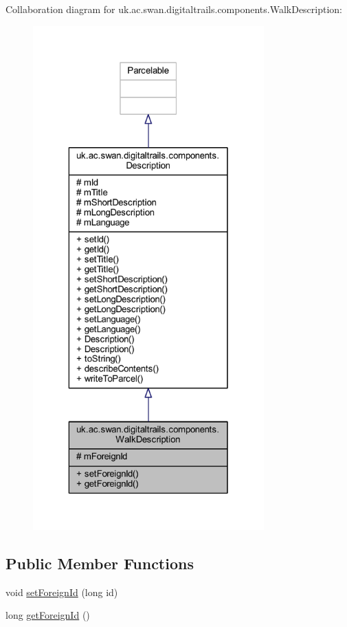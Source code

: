 Collaboration diagram for uk.\+ac.\+swan.\+digitaltrails.\+components.\+Walk\+Description\+:
\nopagebreak
\begin{figure}[H]
\begin{center}
\leavevmode
\includegraphics[height=550pt]{classuk_1_1ac_1_1swan_1_1digitaltrails_1_1components_1_1_walk_description__coll__graph}
\end{center}
\end{figure}
\subsection*{Public Member Functions}
\begin{DoxyCompactItemize}
\item 
void \hyperlink{classuk_1_1ac_1_1swan_1_1digitaltrails_1_1components_1_1_walk_description_a4d324df4e164db2cfa9c3c07912fd7b5}{set\+Foreign\+Id} (long id)
\item 
long \hyperlink{classuk_1_1ac_1_1swan_1_1digitaltrails_1_1components_1_1_walk_description_aaf82d4cb3c6580eac0c679009ce85510}{get\+Foreign\+Id} ()
\end{DoxyCompactItemize}

